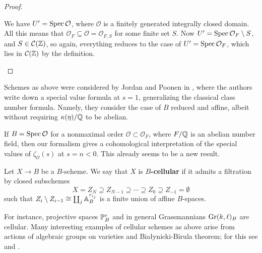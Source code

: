 \documentclass{article}
\numberwithin{equation}{section}
\begin{document}
\begin{proposition}
\begin{proof}
\begin{enumerate}
      We have $U' = \Spec \mathcal{O}$, where $\mathcal{O}$ is a finitely
      generated integrally closed domain. All this means that
      $\mathcal{O}_F \subseteq \mathcal{O} = \mathcal{O}_{F,S}$ for some finite
      set $S$. Now $U' = \Spec \mathcal{O}_F \setminus S$, and
      $S \in \mathcal{C} (\ZZ)$, so again, everything reduces to the case of
      $U' = \Spec \mathcal{O}_F$, which lies in $\mathcal{C} (\ZZ)$ by the
      definition. \qedhere
    \end{enumerate}
  \end{proof}
\end{proposition}

\begin{remark}
  Schemes as above were considered by Jordan and Poonen in
  \cite{Jordan-Poonen-2020}, where the authors write down a special value
  formula at $s = 1$, generalizing the classical class number formula. Namely,
  they consider the case of $B$ reduced and affine, albeit without requiring
  $\kappa (\eta)/\QQ$ to be abelian.
\end{remark}

\begin{example}
  If $B = \Spec \mathcal{O}$ for a nonmaximal order
  $\mathcal{O} \subset \mathcal{O}_F$, where $F/\QQ$ is an abelian number field,
  then our formalism gives a cohomological interpretation of the special values
  of $\zeta_\mathcal{O} (s)$ at $s = n < 0$. This already seems to be a new
  result.
\end{example}

\begin{definition}
  \label{dfn:B-cellular-scheme}
  Let $X \to B$ be a $B$-scheme. We say that $X$ is \textbf{$B$-cellular} if it
  admits a filtration by closed subschemes
  \begin{equation}
    \label{eqn:cellular-decomposition}
    X = Z_N \supseteq Z_{N-1} \supseteq \cdots \supseteq Z_0 \supseteq Z_{-1} = \emptyset
  \end{equation}
  such that $Z_i\setminus Z_{i-1} \cong \coprod_j \AA^{r_{i_j}}_B$ is a finite
  union of affine $B$-spaces.
\end{definition}

For instance, projective spaces $\PP^r_B$ and in general Grassmannians
$\Gr (k,\ell)_B$ are cellular. Many interesting examples of cellular schemes as
above arise from actions of algebraic groups on varieties and Białynicki-Birula
theorem; for this see \cite{Wendt-2010} and \cite{Brosnan-2005}.
\end{document}
